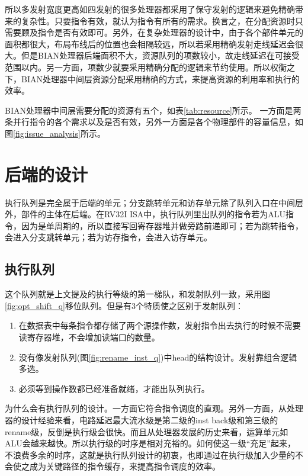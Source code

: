 所以多发射宽度更高如四发射的很多处理器都采用了保守发射的逻辑来避免精确带来的复杂性。只要指令有效，就认为指令有所有的需求。换言之，在分配资源时只需要顾及指令是否有效即可。另外，在复杂处理器的设计中，由于各个部件单元的面积都很大，布局布线后的位置也会相隔较远，所以若采用精确发射走线延迟会很大。但是BIAN处理器后端面积不大，资源队列的项数较小，故走线延迟在可接受范围以内。另一方面，项数少就要采用精确分配的逻辑来节约使用。所以权衡之下，BIAN处理器中间层资源分配采用精确的方式，来提高资源的利用率和执行的效率。


BIAN处理器中间层需要分配的资源有五个，如表\ref{tab:resource}所示。
一方面是两条并行指令的各个需求以及是否有效，另外一方面是各个物理部件的容量信息，如图\ref{fig:issue_analysis}所示。

\section{后端的设计}
执行队列是完全属于后端的单元；分支跳转单元和访存单元除了队列入口在中间层外，部件的主体在后端。在RV32I ISA中，执行队列里出队列的指令若为ALU指令，因为是单周期的，所以直接写回寄存器堆并做旁路前递即可；若为跳转指令，会进入分支跳转单元；若为访存指令，会进入访存单元。

\subsection{执行队列}\label{subsec:execute_q}

这个队列就是上文提及的执行等级的第一梯队，和发射队列一致，采用图\ref{fig:opt_shift_q}移位队列。但是有3个特质使之区别于发射队列：
\begin{enumerate}[label=(\alph*)]
	\item 在数据表中每条指令都存储了两个源操作数，发射指令出去执行的时候不需要读寄存器堆，不会增加读端口的数量。
	\item 没有像发射队列(图\ref{fig:rename_inst_q})中head的结构设计。发射靠组合逻辑多选。
	\item 必须等到操作数都已经准备就绪，才能出队列执行。
\end{enumerate}

为什么会有执行队列的设计。一方面它符合指令调度的直观。另外一方面，从处理器的设计经验来看，电路延迟最大流水级是第二级的inst back级和第三级的rename级，反倒是执行级会很快。而且从处理器发展的历史来看，运算单元如ALU会越来越快。所以执行级的时序是相对充裕的。如何使这一级``充足''起来，不浪费多余的时序，这就是执行队列设计的初衷，也即通过在执行级加入少量的不会使之成为关键路径的指令缓存，来提高指令调度的效率。

